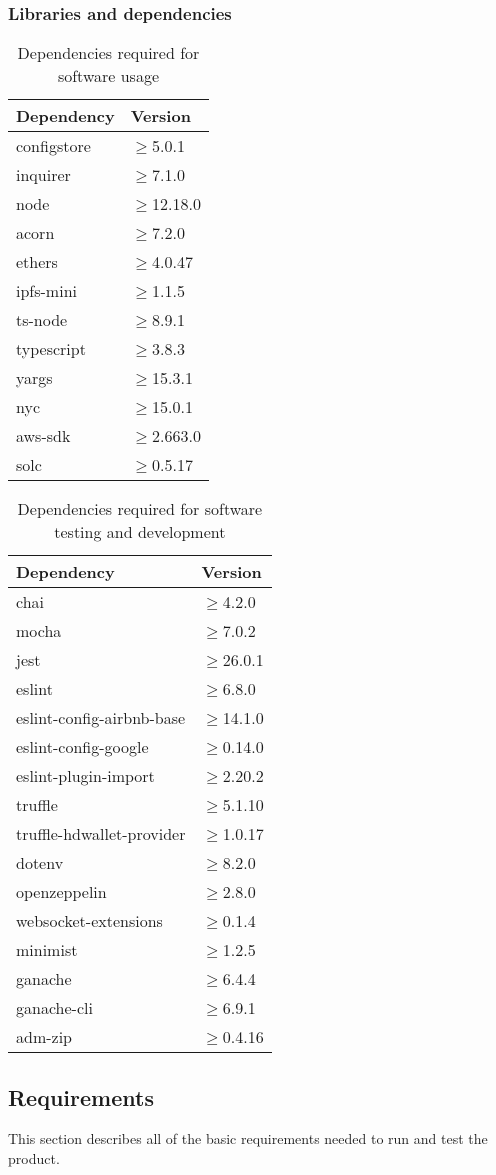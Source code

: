 \subsubsection{Libraries and dependencies}
\begin{longtable}[h!]{
		>{\centering\arraybackslash}p{}
		>{\centering\arraybackslash}p{} }
	\caption{Dependencies required for software usage} \\

	\textbf{\color{white}Dependency} &
	\textbf{\color{white}Version}
	\tabularnewline
	\endhead

	configstore & $\geq$5.0.1 \tabularnewline
	inquirer & $\geq$7.1.0 \tabularnewline
	node & $\geq$12.18.0 \tabularnewline
	acorn & $\geq$7.2.0 \tabularnewline
	ethers & $\geq$4.0.47 \tabularnewline
	ipfs-mini & $\geq$1.1.5 \tabularnewline
	ts-node & $\geq$8.9.1 \tabularnewline
	typescript & $\geq$3.8.3 \tabularnewline
	yargs & $\geq$15.3.1 \tabularnewline
	nyc & $\geq$15.0.1 \tabularnewline
	aws-sdk & $\geq$2.663.0 \tabularnewline
	solc & $\geq$0.5.17 \tabularnewline

\end{longtable}
\begin{longtable}{
		>{\centering\arraybackslash}p{}
		>{\centering\arraybackslash}p{} }
	\caption{Dependencies required for software testing and development} \\

	\textbf{\color{white}Dependency} &
	\textbf{\color{white}Version}
	\tabularnewline
	\endhead

	chai & $\geq$4.2.0 \tabularnewline
	mocha & $\geq$7.0.2 \tabularnewline
	jest & $\geq$26.0.1 \tabularnewline
	eslint & $\geq$6.8.0 \tabularnewline
	eslint-config-airbnb-base & $\geq$14.1.0 \tabularnewline
	eslint-config-google & $\geq$0.14.0 \tabularnewline
	eslint-plugin-import & $\geq$2.20.2 \tabularnewline
	truffle & $\geq$5.1.10 \tabularnewline
	truffle-hdwallet-provider & $\geq$1.0.17 \tabularnewline
	dotenv & $\geq$8.2.0 \tabularnewline
	openzeppelin & $\geq$2.8.0 \tabularnewline
	websocket-extensions & $\geq$0.1.4 \tabularnewline
	minimist & $\geq$1.2.5 \tabularnewline
	ganache & $\geq$6.4.4 \tabularnewline
	ganache-cli & $\geq$6.9.1 \tabularnewline
	adm-zip & $\geq$0.4.16 \tabularnewline

\end{longtable}
\subsection{Requirements}
This section describes all of the basic requirements needed to run and test the product.
